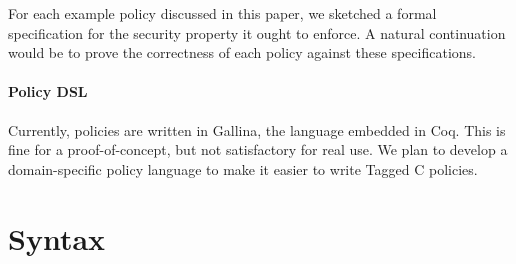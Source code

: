 \documentclass{llncs}
\begin{document}
{For each example policy discussed in this paper, we sketched a formal specification for the
security property it ought to enforce. A natural continuation would be to prove the correctness
of each policy against these specifications.

\paragraph{Policy DSL}

Currently, policies are written in Gallina, the language embedded in Coq. This is fine for a
proof-of-concept, but not satisfactory for real use. We plan to develop a domain-specific policy
language to make it easier to write Tagged C policies.




\appendix

\section{Syntax}

}
\end{document}
